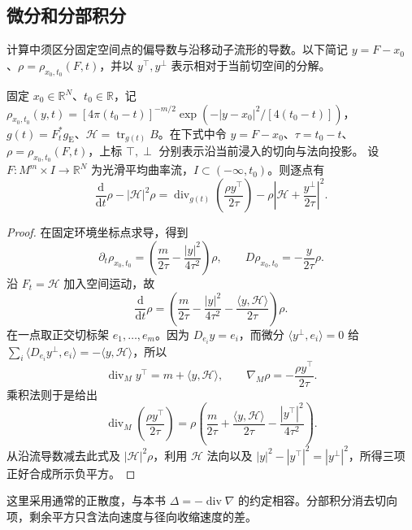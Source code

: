 \subsection{微分和分部积分}
\label{g3:subsec:2803:02}
计算中须区分固定空间点的偏导数与沿移动子流形的导数。以下简记 \(y=F-x_0\)、\(\rho=\rho_{x_0,t_0}(F,t)\)，并以 \(y^\top,y^\perp\) 表示相对于当前切空间的分解。

\begin{lemma}\label{g3:lem:mcf-gaussian-identity}
	固定 \(x_0\in\mathbb R^N\)、\(t_0\in\mathbb R\)，记 \(\rho_{x_0,t_0}(y,t)=[4\pi(t_0-t)]^{-m/2}\exp(-|y-x_0|^2/[4(t_0-t)])\)，\(g(t)=F_t^*g_{\mathrm E}\)、\(\mathcal H=\operatorname{tr}_{g(t)}B\)。在下式中令 \(y=F-x_0\)、\(\tau=t_0-t\)、\(\rho=\rho_{x_0,t_0}(F,t)\)，上标 \(\top,\perp\) 分别表示沿当前浸入的切向与法向投影。
	设 \(F:M^m\times I\to\mathbb R^N\) 为光滑平均曲率流，\(I\subset(-\infty,t_0)\)。则逐点有
	\begin{equation}\label{g3:eq:mcf-gaussian-divergence}
		\frac{\mathrm d}{\mathrm dt}\rho-|\mathcal H|^2\rho
		=\operatorname{div}_{g(t)}\!\left(\frac{\rho y^\top}{2\tau}\right)
		-\rho\left|\mathcal H+\frac{y^\perp}{2\tau}\right|^2.
	\end{equation}
\end{lemma}
\begin{proof}
	在固定环境坐标点求导，得到
	\[
		\partial_t\rho_{x_0,t_0}
		=\left(\frac m{2\tau}-\frac{|y|^2}{4\tau^2}\right)\rho,
		\qquad D\rho_{x_0,t_0}=-\frac{y}{2\tau}\rho.
	\]
	沿 \(F_t=\mathcal H\) 加入空间运动，故
	\[
		\frac{\mathrm d}{\mathrm dt}\rho
		=\left(\frac m{2\tau}-\frac{|y|^2}{4\tau^2}
		-\frac{\langle y,\mathcal H\rangle}{2\tau}\right)\rho.
	\]
	在一点取正交切标架 \(e_1,\dots,e_m\)。因为 \(D_{e_i}y=e_i\)，而微分 \(\langle y^\perp,e_i\rangle=0\) 给
	\(\sum_i\langle D_{e_i}y^\perp,e_i\rangle=-\langle y,\mathcal H\rangle\)，所以
	\[
		\operatorname{div}_M y^\top=m+\langle y,\mathcal H\rangle,
		\qquad \nabla_M\rho=-\frac{\rho y^\top}{2\tau}.
	\]
	乘积法则于是给出
	\[
		\operatorname{div}_M\left(\frac{\rho y^\top}{2\tau}\right)
		=\rho\left(\frac m{2\tau}
		+\frac{\langle y,\mathcal H\rangle}{2\tau}
		-\frac{|y^\top|^2}{4\tau^2}\right).
	\]
	从沿流导数减去此式及 \(|\mathcal H|^2\rho\)，利用 \(\mathcal H\) 法向以及 \(|y|^2-|y^\top|^2=|y^\perp|^2\)，所得三项正好合成所示负平方。
\end{proof}

这里采用通常的正散度，与本书 \(\Delta=-\operatorname{div}\nabla\) 的约定相容。分部积分消去切向项，剩余平方只含法向速度与径向收缩速度的差。

